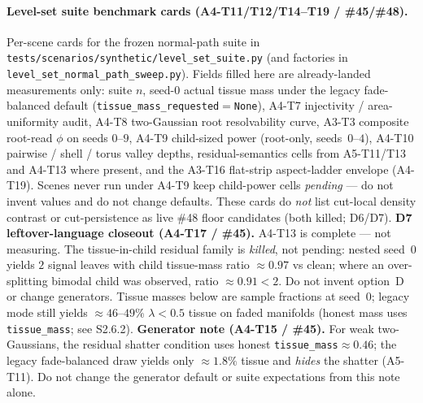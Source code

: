 \documentclass[11pt]{article}
\begin{document}
\paragraph{Level-set suite benchmark cards (A4-T11/T12/T14--T19 / \#45/\#48).}
\label{sec:si-s14-level-set-benchmark-cards}
Per-scene cards for the frozen normal-path suite in
\texttt{tests/scenarios/synthetic/level\_set\_suite.py}
(and factories in
\texttt{level\_set\_normal\_path\_sweep.py}).
Fields filled here are already-landed measurements only:
suite $n$, seed-$0$ actual tissue mass under the legacy fade-balanced
default (\texttt{tissue\_mass\_requested}${}={}$\texttt{None}),
A4-T7 injectivity / area-uniformity audit, A4-T8 two-Gaussian root
resolvability curve, A3-T3 composite root-read $\phi$ on seeds
$0$--$9$, A4-T9 child-sized power (root-only, seeds~$0$--$4$),
A4-T10 pairwise / shell / torus valley depths, residual-semantics
cells from A5-T11/T13 and A4-T13 where present, and the A3-T16
flat-strip aspect-ladder envelope (A4-T19).
Scenes never run under A4-T9 keep child-power cells
\emph{pending} --- do not invent values and do not change defaults.
These cards do \emph{not} list cut-local density contrast or
cut-persistence as live \#48 floor candidates (both killed; D6/D7).
\textbf{D7 leftover-language closeout (A4-T17 / \#45).}
A4-T13 is complete --- not measuring. The tissue-in-child residual
family is \emph{killed}, not pending: nested seed~$0$ yields $2$
signal leaves with child tissue-mass ratio $\approx 0.97$ vs clean;
where an over-splitting bimodal child was observed, ratio
$\approx 0.91{<}2$. Do not invent option~D or change generators.
Tissue masses below are sample fractions at seed~$0$; legacy mode still
yields $\approx 46$--$49\%$ $\lambda{<}0.5$ tissue on faded manifolds
(honest mass uses \texttt{tissue\_mass}; see S2.6.2).
\textbf{Generator note (A4-T15 / \#45).}
For weak two-Gaussians, the residual shatter condition uses honest
\texttt{tissue\_mass}${}\approx 0.46$; the legacy fade-balanced draw
yields only $\approx 1.8\%$ tissue and \emph{hides} the shatter
(A5-T11). Do not change the generator default or suite expectations
from this note alone.
\end{document}
